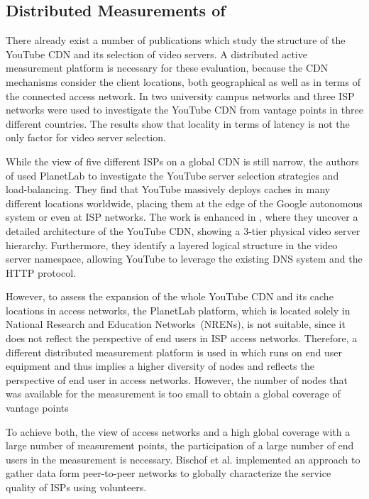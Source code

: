 \subsection{Distributed Measurements of }
There already exist a number of publications which study the structure of the YouTube CDN and its selection of video servers.
A distributed active measurement platform is necessary for these evaluation, because the CDN mechanisms consider the client locations, both geographical as well as in terms of the connected access network.
In \cite{torres2011dissecting} two university campus networks and three ISP networks were used to investigate the YouTube CDN from vantage points in three different countries.
The results show that locality in terms of latency is not the only factor for video server selection.

While the view of five different ISPs on a global CDN is still narrow, the authors of \cite{adhikari2011you} used PlanetLab  to investigate the YouTube server selection strategies and load-balancing.
They find that YouTube massively deploys caches in many different locations worldwide, placing them at the edge of the Google autonomous system or even at ISP networks.
The work is enhanced in \cite{adhikari2012vivisecting}, where they uncover a detailed architecture of the YouTube CDN, showing a 3-tier physical video server hierarchy.
Furthermore, they identify a layered logical structure in the video server namespace, allowing YouTube to leverage the existing DNS system and the HTTP protocol.

However, to assess the expansion of the whole YouTube CDN and its cache locations in access networks, the PlanetLab platform, which is located solely in National Research and Education Networks~(NRENs), is not suitable, since it does not reflect the perspective of end users in ISP access networks.
Therefore, a different distributed measurement platform is used in \cite{rafetseder2011exploring} which runs on end user equipment and thus implies a higher diversity of nodes and reflects the perspective of end user in access networks.
However, the number of nodes that was available for the measurement is too small to obtain a global coverage of vantage points

To achieve both, the view of access networks and a high global coverage with a large number of measurement points, the participation of a large number of end users in the measurement is necessary.
Bischof et al. \cite{bischof2011crowdsourcing} implemented an approach to gather data form peer-to-peer networks to globally characterize the service quality of ISPs using volunteers.


